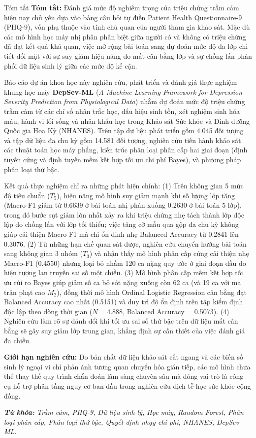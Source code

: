 \documentclass{uetgraduation}
\begin{document}
\begin{preamble}{Tóm tắt}
\textbf{Tóm tắt:} Đánh giá mức độ nghiêm trọng của triệu chứng trầm cảm hiện nay chủ yếu dựa vào bảng câu hỏi tự điền Patient Health Questionnaire-9 (PHQ-9), vốn phụ thuộc vào tính chủ quan của người tham gia khảo sát. Mặc dù các mô hình học máy nhị phân phân biệt giữa người có và không có triệu chứng đã đạt kết quả khả quan, việc mở rộng bài toán sang dự đoán mức độ đa lớp chi tiết đối mặt với sự suy giảm hiệu năng do mất cân bằng lớp và sự chồng lấn phân phối dữ liệu sinh lý giữa các mức độ kế cận.

Báo cáo dự án khoa học này nghiên cứu, phát triển và đánh giá thực nghiệm khung học máy \textbf{DepSev-ML} (\textit{A Machine Learning Framework for Depression Severity Prediction from Physiological Data}) nhằm dự đoán mức độ triệu chứng trầm cảm từ các chỉ số nhân trắc học, dấu hiệu sinh tồn, xét nghiệm sinh hóa máu, hành vi lối sống và nhân khẩu học trong Khảo sát Sức khỏe và Dinh dưỡng Quốc gia Hoa Kỳ (NHANES). Trên tập dữ liệu phát triển gồm 4.045 đối tượng và tập dữ liệu đa chu kỳ gồm 14.581 đối tượng, nghiên cứu tiến hành khảo sát các thuật toán học máy phẳng, kiến trúc phân loại phân cấp hai giai đoạn (định tuyến cứng và định tuyến mềm kết hợp tối ưu chi phí Bayes), và phương pháp phân loại thứ bậc.

Kết quả thực nghiệm chỉ ra những phát hiện chính: (1) Trên không gian 5 mức độ tiêu chuẩn ($T_5$), hiệu năng mô hình suy giảm mạnh khi số lượng lớp tăng (Macro-F1 giảm từ 0.6639 ở bài toán nhị phân xuống 0.2630 ở bài toán 5 lớp), trong đó bước sụt giảm lớn nhất xảy ra khi triệu chứng nhẹ tách thành lớp độc lập do chồng lấn với lớp tối thiểu; việc tăng cỡ mẫu qua gộp đa chu kỳ không giúp cải thiện Macro-F1 mà chỉ ổn định nhẹ Balanced Accuracy từ 0.2841 lên 0.3076. (2) Từ những hạn chế quan sát được, nghiên cứu chuyển hướng bài toán sang không gian 3 nhóm ($T_3$) và nhận thấy mô hình phân cấp cứng cải thiện nhẹ Macro-F1 (0.4550) nhưng loại bỏ nhầm 120 ca nặng quy ước ở giai đoạn đầu do hiện tượng lan truyền sai số một chiều. (3) Mô hình phân cấp mềm kết hợp tối ưu rủi ro Bayes giúp giảm số ca bỏ sót nặng xuống còn 62 ca (và 19 ca với ma trận phạt cao $M_2$), đồng thời mô hình Ordinal Logistic Regression cân bằng đạt Balanced Accuracy cao nhất (0.5151) và duy trì độ ổn định trên tập kiểm định độc lập theo dòng thời gian ($N = 4.888$, Balanced Accuracy = 0.5073). (4) Nghiên cứu làm rõ sự đánh đổi khi tối ưu sai số thứ bậc trên dữ liệu mất cân bằng sẽ gây suy giảm lớp trung gian, khẳng định sự cần thiết của việc đánh giá đa chiều.

\textbf{Giới hạn nghiên cứu:} Do bản chất dữ liệu khảo sát cắt ngang và các biến số sinh lý ngoại vi chỉ phản ánh tương quan chuyển hóa gián tiếp, các mô hình chưa thể thay thế quy trình chẩn đoán lâm sàng chuyên sâu mà đóng vai trò là công cụ hỗ trợ phân tầng nguy cơ ban đầu trong nghiên cứu dịch tễ học sức khỏe cộng đồng.

\vspace{0.6cm}
\noindent \textit{\textbf{Từ khóa:} Trầm cảm, PHQ-9, Dữ liệu sinh lý, Học máy, Random Forest, Phân loại phân cấp, Phân loại thứ bậc, Quyết định nhạy chi phí, NHANES, DepSev-ML.}
\end{preamble}
\end{document}
